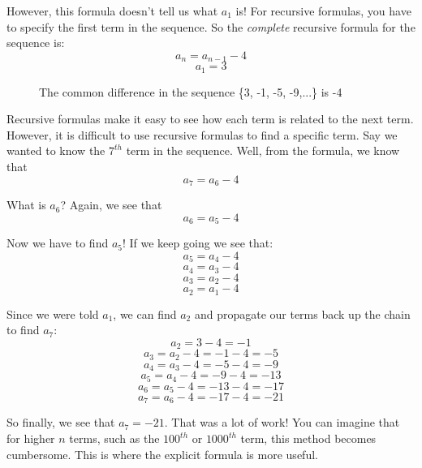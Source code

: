 However, this formula doesn't tell us what $a_1$ is! For recursive 
formulas, you have to specify the first term in the sequence. So the 
\textit{complete} recursive formula for the sequence is:
$$a_n = a_{n-1}-4$$
$$a_1 = 3$$

\begin{figure}[htbp]
\centering
    \caption{The common difference in the sequence \{3, -1, -5, -9,...\} is -4}
    \label{fig:comdiff}
\end{figure}

Recursive formulas make it easy to see how each term is related to 
the next term. However, it is difficult to use recursive formulas to 
find a specific term. Say we wanted to know the $7^{th}$ term in the 
sequence. Well, from the formula, we know that
$$a_7 = a_6 - 4$$

What is $a_6$? Again, we see that
$$a_6 = a_5 - 4$$

Now we have to find $a_5$! If we keep going we see that:
$$a_5 = a_4 - 4$$
$$a_4 = a_3 - 4$$
$$a_3 = a_2 - 4$$
$$a_2 = a_1 - 4$$

Since we were told $a_1$, we can find $a_2$ and propagate our terms 
back up the chain to find $a_7$:
$$a_2 = 3 - 4 = -1$$
$$a_3 = a_2 - 4 = -1 - 4 = -5$$
$$a_4 = a_3 - 4 = -5 - 4 = -9$$
$$a_5 = a_4 - 4 = -9 - 4 = -13$$
$$a_6 = a_5 - 4 = -13 - 4 = -17$$
$$a_7 = a_6 - 4 = -17 - 4 = -21$$

So finally, we see that $a_7 = -21$. That was a lot of work! You can 
imagine that for higher $n$ terms, such as the $100^{th}$ or 
$1000^{th}$ term, this method becomes cumbersome. This is where the 
explicit formula is more useful.

